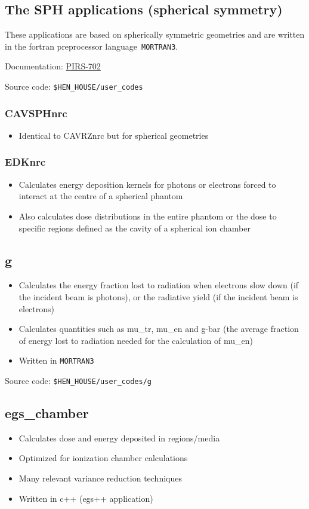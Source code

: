 \documentclass[12pt,twoside]{article}
\begin{document}
\clearpage
\subsection{The SPH applications (spherical symmetry)}
These applications are based on spherically symmetric geometries and are
written in the fortran preprocessor language \,\Verb|MORTRAN3|.

Documentation: \href{http://nrc-cnrc.github.io/EGSnrc/doc/pirs702-egsnrc-codes.pdf}{PIRS-702}

Source code: \Verb+$HEN_HOUSE/user_codes+

\subsubsection{CAVSPHnrc}
\begin{itemize}
\item Identical to CAVRZnrc but for spherical geometries
\end{itemize}
\subsubsection{EDKnrc}
\begin{itemize}
\item Calculates energy deposition kernels for photons or electrons forced to interact
at the centre of a spherical phantom
\item Also calculates dose distributions in the entire phantom or the dose to specific regions defined as the cavity of a spherical ion chamber
\end{itemize}

\clearpage
\subsection{g}
\begin{itemize}
\item Calculates the energy fraction lost to radiation when electrons slow down (if the incident beam is photons), or the radiative yield (if the incident beam is electrons)
\item Calculates quantities such as mu\_tr, mu\_en and g-bar (the average fraction of energy lost to radiation needed for the calculation of mu\_en)
\item Written in \Verb+MORTRAN3+
\end{itemize}

Source code: \Verb+$HEN_HOUSE/user_codes/g+

\subsection{egs\_chamber}
\begin{itemize}
\item Calculates dose and energy deposited in regions/media
\item Optimized for ionization chamber calculations
\item Many relevant variance reduction techniques
\item Written in c++ (egs++ application)
\end{itemize}
\end{document}
